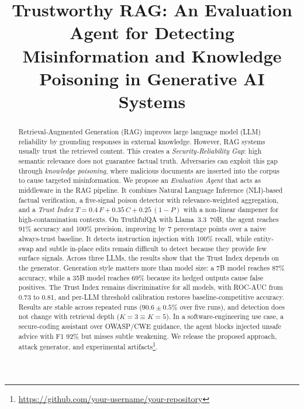 \documentclass[conference]{IEEEtran}
\begin{document}
\title{Trustworthy RAG: An Evaluation Agent for Detecting Misinformation and Knowledge Poisoning in Generative AI Systems}

\author{
}

\maketitle

\begin{abstract}
Retrieval-Augmented Generation (RAG) improves large language model (LLM) reliability by grounding responses in external knowledge. However, RAG systems usually trust the retrieved content. This creates a \emph{Security-Reliability Gap}: high semantic relevance does not guarantee factual truth. Adversaries can exploit this gap through \emph{knowledge poisoning}, where malicious documents are inserted into the corpus to cause targeted misinformation. We propose an \emph{Evaluation Agent} that acts as middleware in the RAG pipeline. It combines Natural Language Inference (NLI)-based factual verification, a five-signal poison detector with relevance-weighted aggregation, and a \emph{Trust Index} $T = 0.4\,F + 0.35\,C + 0.25\,(1-P)$ with a non-linear dampener for high-contamination contexts. On TruthfulQA with Llama~3.3~70B, the agent reaches 91\% accuracy and 100\% precision, improving by 7 percentage points over a naive always-trust baseline. It detects instruction injection with 100\% recall, while entity-swap and subtle in-place edits remain difficult to detect because they provide few surface signals. Across three LLMs, the results show that the Trust Index depends on the generator. Generation style matters more than model size: a 7B model reaches 87\% accuracy, while a 35B model reaches 69\% because its hedged outputs cause false positives. The Trust Index remains discriminative for all models, with ROC-AUC from 0.73 to 0.81, and per-LLM threshold calibration restores baseline-competitive accuracy. Results are stable across repeated runs ($90.6{\pm}0.5\%$ over five runs), and detection does not change with retrieval depth ($K{=}3 \equiv K{=}5$). In a software-engineering use case, a secure-coding assistant over OWASP/CWE guidance, the agent blocks injected unsafe advice with F1 92\% but misses subtle weakening. We release the proposed approach, attack generator, and experimental artifacts\footnote{\url{https://github.com/your-username/your-repository}}.
\end{abstract}
\end{document}
